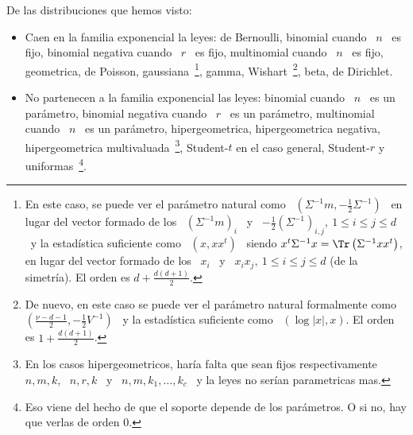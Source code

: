 De las distribuciones que hemos visto:
%
\begin{itemize}
\item Caen en  la familia exponencial la leyes: de  Bernoulli, binomial cuando \
  $n$ \ es fijo, binomial negativa cuando  \ $r$ \ es fijo, multinomial cuando \
  $n$ \  es fijo, geometrica,  de Poisson, gaussiana~\footnote{En este  caso, se
    puede ver  el par\'ametro  natural como \  $\left( \Sigma^{-1} m  , -\frac12
      \Sigma^{-1}  \right)$ \  en  lugar del  vector  formado de  los \  $\left(
      \Sigma^{-1} m \right)_i$ \ y \ $-\frac12 \left( \Sigma^{-1} \right)_{i,j},
    \: 1 \le i \le j \le d$ \ y la estad\'istica suficiente como \ $\left( x , x
      x^t \right)$  \ siendo  $x^t \Sigma^{-1} x  = \Tr\left( \Sigma^{-1}  x x^t
    \right)$, en lugar  del vector formado de los  \ $x_i$ \ y \ $x_i  x_j, \: 1
    \le  i  \le  j \le  d$  (de  la  simetr\'ia).   El  orden es  $d  +  \frac{d
      (d+1)}{2}$.}, gamma, Wishart~\footnote{De nuevo, en este caso se puede ver
    el  par\'ametro  natural  formalmente  como \  $\left(  \frac{\nu-d-1}{2}  ,
      -\frac12 V^{-1}  \right)$ \ y  la estad\'istica suficiente como  \ $\left(
      \log |x|  , x \right)$.  El orden  es $1 + \frac{d  (d+1)}{2}$.}, beta, de
  Dirichlet.
%
%
\item No partenecen a la familia  exponencial las leyes: binomial cuando \ $n$ \
  es  un  par\'ametro, binomial  negativa  cuando \  $r$  \  es un  par\'ametro,
  multinomial cuando \ $n$ \ es un par\'ametro, hipergeometrica, hipergeometrica
  negativa,     hipergeometrica      multivaluada~\footnote{En     los     casos
    hipergeometricos, har\'ia falta que sean  fijos respectivamente \ $n, m, k$,
    \ $n,  r, k$  \ y  \ $n,  m, k_1, \ldots  , k_c$  \ y  la leyes  no ser\'ian
    parametricas  mas.},   Student-$t$  en   el  caso  general,   Student-$r$  y
  uniformas~\footnote{Eso  viene del  hecho de  que  el soporte  depende de  los
    par\'ametros. O si no, hay que verlas de orden 0.}.
\end{itemize}

